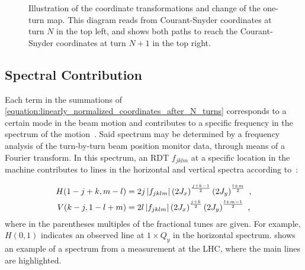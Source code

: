 \begin{figure}[!htb]
    \begin{center}
    \caption{Illustration of the coordinate transformations and change of the one-turn map. This diagram reads from Courant-Snyder coordinates at turn \(N\) in the top left, and shows both paths to reach the Courant-Snyder coordinates at turn \(N+1\) in the top right.}
    \label{figure:coordinate_transformations}
    \end{center}
\end{figure}

\subsection{Spectral Contribution}
\label{subsec:spectral_contribution}

Each term in the summations of \cref{equation:linearly_normalized_coordinates_after_N_turns} corresponds to a certain mode in the beam motion and contributes to a specific frequency in the spectrum of the motion~\cite{PHD:Bengtsson}.
Said spectrum may be determined by a frequency analysis of the turn-by-turn beam position monitor data, through means of a Fourier transform.
In this spectrum, an RDT \(f_{jklm}\) at a specific location in the machine contributes to lines in the horizontal and vertical spectra according to~\cite{PHD:Bengtsson}:

\begin{equation}
    \begin{aligned}
        H(1-j+k, m-l) &= 2 j \left\lvert f_{jklm} \right\rvert \left( 2 J_x \right)^{\frac{j+k-1}{2}} \left( 2 J_y \right)^{\frac{l+m}{2}} \text{ ,}\\
        V(k-j, 1-l+m) &= 2 l \left\lvert f_{jklm} \right\rvert \left( 2 J_x \right)^{\frac{j+k}{2}} \left( 2 J_y \right)^{\frac{l+m-1}{2}} \text{ ,}
    \end{aligned}
    \label{equation:rdt_contribution_to_spectrum_line}
\end{equation}
where in the parentheses multiples of the fractional tunes are given.
For example, \(H(0,1)\) indicates an observed line at \(1 \times Q_y\) in the horizontal spectrum.
 shows an example of a spectrum from a measurement at the LHC, where the main lines are highlighted.


